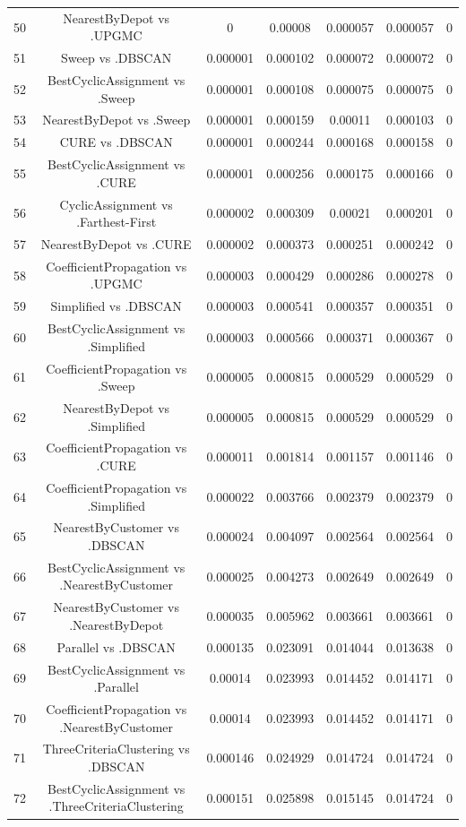 \documentclass[a4paper,10pt]{article}
\begin{document}
\begin{landscape}
\begin{table}[!htp]
\begin{tabular}{ccccccc}
50&NearestByDepot vs .UPGMC&0&0.00008&0.000057&0.000057&0\\
51&Sweep vs .DBSCAN&0.000001&0.000102&0.000072&0.000072&0\\
52&BestCyclicAssignment vs .Sweep&0.000001&0.000108&0.000075&0.000075&0\\
53&NearestByDepot vs .Sweep&0.000001&0.000159&0.00011&0.000103&0\\
54&CURE vs .DBSCAN&0.000001&0.000244&0.000168&0.000158&0\\
55&BestCyclicAssignment vs .CURE&0.000001&0.000256&0.000175&0.000166&0\\
56&CyclicAssignment vs .Farthest-First&0.000002&0.000309&0.00021&0.000201&0\\
57&NearestByDepot vs .CURE&0.000002&0.000373&0.000251&0.000242&0\\
58&CoefficientPropagation vs .UPGMC&0.000003&0.000429&0.000286&0.000278&0\\
59&Simplified vs .DBSCAN&0.000003&0.000541&0.000357&0.000351&0\\
60&BestCyclicAssignment vs .Simplified&0.000003&0.000566&0.000371&0.000367&0\\
61&CoefficientPropagation vs .Sweep&0.000005&0.000815&0.000529&0.000529&0\\
62&NearestByDepot vs .Simplified&0.000005&0.000815&0.000529&0.000529&0\\
63&CoefficientPropagation vs .CURE&0.000011&0.001814&0.001157&0.001146&0\\
64&CoefficientPropagation vs .Simplified&0.000022&0.003766&0.002379&0.002379&0\\
65&NearestByCustomer vs .DBSCAN&0.000024&0.004097&0.002564&0.002564&0\\
66&BestCyclicAssignment vs .NearestByCustomer&0.000025&0.004273&0.002649&0.002649&0\\
67&NearestByCustomer vs .NearestByDepot&0.000035&0.005962&0.003661&0.003661&0\\
68&Parallel vs .DBSCAN&0.000135&0.023091&0.014044&0.013638&0\\
69&BestCyclicAssignment vs .Parallel&0.00014&0.023993&0.014452&0.014171&0\\
70&CoefficientPropagation vs .NearestByCustomer&0.00014&0.023993&0.014452&0.014171&0\\
71&ThreeCriteriaClustering vs .DBSCAN&0.000146&0.024929&0.014724&0.014724&0\\
72&BestCyclicAssignment vs .ThreeCriteriaClustering&0.000151&0.025898&0.015145&0.014724&0\\

\end{tabular}
\end{table}
\end{landscape}
\end{document}
